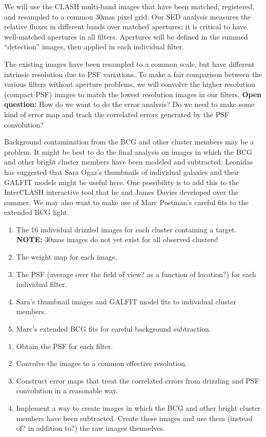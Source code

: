 \documentclass[preprint,12pt]{aastex}
\begin{document}
We will use the CLASH multi-band images that have been matched,
registered, and resampled to a common 30mas pixel grid.  Our SED
analysis measures the relative fluxes in different bands over matched
apertures; it is critical to have well-matched apertures in all
filters.  Apertures will be defined in the summed ``detection''
images, then applied in each individual filter.

The existing images have been resampled to a common scale, but have
different intrinsic resolution due to PSF variations.  To make a fair
comparison between the various filters without aperture problems, we
will convolve the higher resolution (compact PSF) images to match the
lowest resolution images in our filters.  {\bf{Open question:}} How do
we want to do the error analysis?  Do we need to make some kind of
error map and track the correlated errors generated by the PSF
convolution?

Background contamination from the BCG and other cluster members may be
a problem.  It might be best to do the final analysis on images in
which the BCG and other bright cluster members have been modeled and
subtracted.  Leonidas has suggested that Sara Ogaz's thumbnails of
individual galaxies and their GALFIT models might be useful here.  One
possibility is to add this to the InterCLASH interactive tool that he
and James Davies developed over the summer.  We may also want to make
use of Marc Postman's careful fits to the extended BCG light.

\vspace{0.08in}
\vspace{-0.1in}
\begin{enumerate}\itemsep-6pt
\item The 16 individual drizzled images for each cluster containing a
  target.  {\bf{NOTE:}} 30mas images do not yet exist for all observed
  clusters! 
\item The weight map for each image.
\item The PSF (average over the field of view? as a function of
  location?) for each individual filter.
\item Sara's thumbnail images and GALFIT model fits to individual
  cluster members.
\item Marc's extended BCG fits for careful background subtraction.
\end{enumerate}

\vspace{-0.1in}
\begin{enumerate}\itemsep-6pt
\item Obtain the PSF for each filter.  
\item Convolve the images to a common effective resolution.
\item Construct error maps that treat the correlated errors from
  drizzling and PSF convolution in a reasonable way.
\item Implement a way to create images in which the BCG and other
  bright cluster members have been subtracted.  Create these images
  and use them (instead of? in addition to?) the raw images
  themselves.
\end{enumerate}
\end{document}
